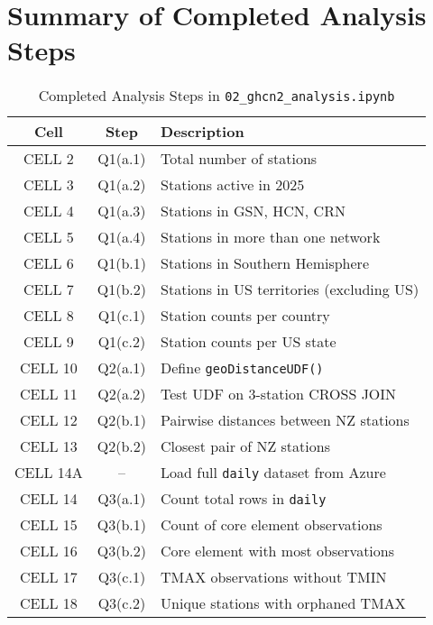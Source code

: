\documentclass[11pt]{article}
\begin{document}
\section*{Summary of Completed Analysis Steps}

\begin{table}[H]
    \centering
    \caption{Completed Analysis Steps in \texttt{02\_ghcn2\_analysis.ipynb}}
    \begin{tabularx}{\textwidth}{|c|c|X|}
    \hline
    \textbf{Cell} & \textbf{Step} & \textbf{Description} \\
    \hline
    CELL 2   & Q1(a.1) & Total number of stations \\
    CELL 3   & Q1(a.2) & Stations active in 2025 \\
    CELL 4   & Q1(a.3) & Stations in GSN, HCN, CRN \\
    CELL 5   & Q1(a.4) & Stations in more than one network \\
    CELL 6   & Q1(b.1) & Stations in Southern Hemisphere \\
    CELL 7   & Q1(b.2) & Stations in US territories (excluding US) \\
    CELL 8   & Q1(c.1) & Station counts per country \\
    CELL 9   & Q1(c.2) & Station counts per US state \\
    \hline
    CELL 10  & Q2(a.1) & Define \texttt{geoDistanceUDF()} \\
    CELL 11  & Q2(a.2) & Test UDF on 3-station CROSS JOIN \\
    CELL 12  & Q2(b.1) & Pairwise distances between NZ stations \\
    CELL 13  & Q2(b.2) & Closest pair of NZ stations \\
    \hline
    CELL 14A & –       & Load full \texttt{daily} dataset from Azure \\
    CELL 14  & Q3(a.1) & Count total rows in \texttt{daily} \\
    CELL 15  & Q3(b.1) & Count of core element observations \\
    CELL 16  & Q3(b.2) & Core element with most observations \\
    CELL 17  & Q3(c.1) & TMAX observations without TMIN \\
    CELL 18  & Q3(c.2) & Unique stations with orphaned TMAX \\
    \hline
    \end{tabularx}
    \end{table}






\printbibliography

\newpage

\begin{appendices}

\end{appendices}
\end{document}
